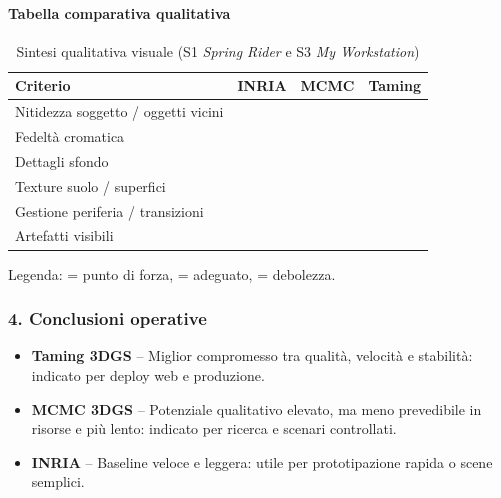 \paragraph{Tabella comparativa qualitativa}
\begin{table}[H]
	\centering
	\caption{Sintesi qualitativa visuale (S1 \textit{Spring Rider} e S3 \textit{My Workstation})}
	\label{tab:benchmark1_quality_visual}
	\begin{tabularx}{\linewidth}{l >{\centering\arraybackslash}X >{\centering\arraybackslash}X >{\centering\arraybackslash}X}
		\toprule
		\textbf{Criterio} & \textbf{INRIA} & \textbf{MCMC} & \textbf{Taming} \\
		\midrule
		Nitidezza soggetto / oggetti vicini & \warn & \cmark & \cmark \\
		Fedeltà cromatica                   & \warn & \warn  & \cmark \\
		Dettagli sfondo                      & \warn & \cmark & \cmark \\
		Texture suolo / superfici            & \xmark & \warn  & \cmark \\
		Gestione periferia / transizioni     & \xmark & \warn  & \cmark \\
		Artefatti visibili                   & \warn & \xmark & \cmark \\
		\bottomrule
	\end{tabularx}
	\vspace{0.4em}
	\footnotesize
	Legenda: \cmark = punto di forza,\; \warn = adeguato,\; \xmark = debolezza.
\end{table}



\subsubsection*{4. Conclusioni operative}
\begin{itemize}
	\item \textbf{Taming 3DGS} -- Miglior compromesso tra qualità, velocità e stabilità: indicato per deploy web e produzione.
	\item \textbf{MCMC 3DGS} -- Potenziale qualitativo elevato, ma meno prevedibile in risorse e più lento: indicato per ricerca e scenari controllati.
	\item \textbf{INRIA} -- Baseline veloce e leggera: utile per prototipazione rapida o scene semplici.
\end{itemize}

